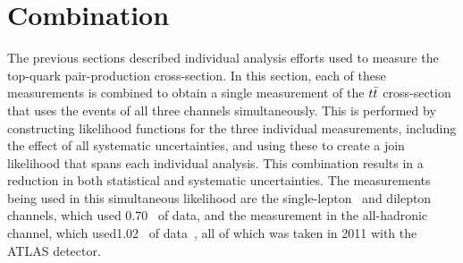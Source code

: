 
\section{Combination}



The previous sections described individual analysis efforts used to measure the top-quark pair-production cross-section.
In this section, each of these measurements is combined to obtain a single measurement of the $t\bar{t}$ cross-section 
that uses the events of all three channels simultaneously.
This is performed by constructing likelihood functions for the three individual measurements, including the effect of all
systematic uncertainties, and using these to create a join likelihood that spans each individual analysis.
This combination results in a reduction in both statistical and systematic uncertainties.
The measurements being used in this simultaneous likelihood are the single-lepton~\cite{LEPTON_JETS_NOTE_2011} and dilepton~\cite{DILEPTON_PAPER} channels,
which used 0.70 \ifb\ of data, and the measurement in the all-hadronic channel, 
which used1.02 \ifb\ of data~\cite{ATLAS-CONF-2011-140}, all of which was taken in 2011 with the ATLAS detector.


